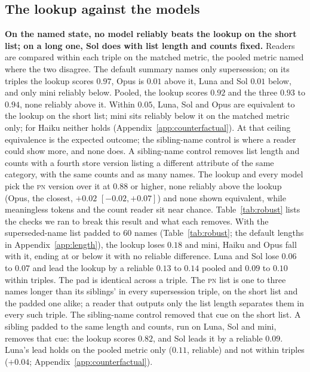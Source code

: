 \documentclass{article}
\newcommand{\claim}[1]{\textbf{#1}}
\newcommand{\pn}{\textsc{pn}}
\begin{document}
\subsection{The lookup against the models}\label{sec:lookup}
\claim{On the named state, no model reliably beats the lookup on the short list; on a long one, Sol does with list length and counts fixed.}
Readers are compared within each triple on the matched metric, the pooled metric named where the two disagree. The default summary names only supersession; on its triples the lookup scores $0.97$, Opus is $0.01$ above it, Luna and Sol $0.01$ below, and only mini reliably below. Pooled, the lookup scores $0.92$ and the three $0.93$ to $0.94$, none reliably above it. Within $0.05$, Luna, Sol and Opus are equivalent to the lookup on the short list; mini sits reliably below it on the matched metric only; for Haiku neither holds (Appendix~\ref{app:counterfactual}). At that ceiling equivalence is the expected outcome; the sibling-name control is where a reader could show more, and none does. A sibling-name control removes list length and counts with a fourth store version listing a different attribute of the same category, with the same counts and as many names. The lookup and every model pick the \pn{} version over it at $0.88$ or higher, none reliably above the lookup (Opus, the closest, $+0.02$ $[-0.02,+0.07]$) and none shown equivalent, while meaningless tokens and the count reader sit near chance. %
Table~\ref{tab:robust} lists the checks we ran to break this result and what each removes. With the superseded-name list padded to $60$ names (Table~\ref{tab:robust}; the default lengths in Appendix~\ref{app:length}), the lookup loses $0.18$ and mini, Haiku and Opus fall with it, ending at or below it with no reliable difference. Luna and Sol lose $0.06$ to $0.07$ and lead the lookup by a reliable $0.13$ to $0.14$ pooled and $0.09$ to $0.10$ within triples. The pad is identical across a triple. The \pn{} list is one to three names longer than its siblings' in every supersession triple, on the short list and the padded one alike; a reader that outputs only the list length separates them in every such triple. The sibling-name control removed that cue on the short list. A sibling padded to the same length and counts, run on Luna, Sol and mini, removes that cue: the lookup scores $0.82$, and Sol leads it by a reliable $0.09$. Luna's lead holds on the pooled metric only ($0.11$, reliable) and not within triples ($+0.04$; Appendix~\ref{app:counterfactual}).
\end{document}
